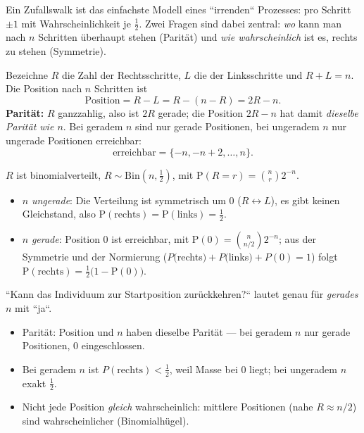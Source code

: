 


Ein Zufallswalk ist das einfachste Modell eines ``irrenden`` Prozesses:
pro Schritt $\pm1$ mit Wahrscheinlichkeit je $\tfrac12$. Zwei Fragen sind
dabei zentral: \emph{wo} kann man nach $n$ Schritten überhaupt stehen
(Parität) und \emph{wie wahrscheinlich} ist es, rechts zu stehen
(Symmetrie).

\begin{werkzeugkasten}[Zentrale Beziehung: Position = $2R-n$]
Bezeichne $R$ die Zahl der Rechtsschritte, $L$ die der Linksschritte und
$R+L=n$. Die Position nach $n$ Schritten ist
\begin{equation}
  \text{Position} = R-L = R-(n-R)=2R-n .
\end{equation}
\textbf{Parität:} $R$ ganzzahlig, also ist $2R$ gerade; die Position
$2R-n$ hat damit \emph{dieselbe Parität wie $n$}. Bei geradem $n$ sind nur
gerade Positionen, bei ungeradem $n$ nur ungerade Positionen erreichbar:
\begin{equation}
  \text{erreichbar}=\{-n,-n+2,\dots,n\}.
\end{equation}
\end{werkzeugkasten}

\begin{werkzeugkasten}
$R$ ist binomialverteilt, $R\sim\mathrm{Bin}(n,\tfrac12)$, mit
$\mathrm P(R=r)=\binom{n}{r}2^{-n}$.
\begin{itemize}
  \item $n$ \emph{ungerade}: Die Verteilung ist symmetrisch um $0$
        ($R\leftrightarrow L$), es gibt keinen Gleichstand, also
        $\mathrm P(\text{rechts})=\mathrm P(\text{links})=\tfrac12$.
  \item $n$ \emph{gerade}: Position $0$ ist erreichbar, mit
        $\mathrm P(0)=\binom{n}{n/2}2^{-n}$; aus der Symmetrie und der
        Normierung ($P($rechts$)+P($links$)+P(0)=1$) folgt
        $\mathrm P(\text{rechts})=\frac12\bigl(1-\mathrm P(0)\bigr)$.
\end{itemize}
``Kann das Individuum zur Startposition zurückkehren?`` lautet genau für
\emph{gerades} $n$ mit ``ja``.
\end{werkzeugkasten}

\begin{achtung}
\begin{itemize}
  \item Parität: Position und $n$ haben dieselbe Parität --- bei geradem
        $n$ nur gerade Positionen, $0$ eingeschlossen.
  \item Bei geradem $n$ ist $P(\text{rechts})<\tfrac12$, weil Masse bei
        $0$ liegt; bei ungeradem $n$ exakt $\tfrac12$.
  \item Nicht jede Position \emph{gleich} wahrscheinlich: mittlere
        Positionen (nahe $R\approx n/2$) sind wahrscheinlicher
        (Binomialhügel).
\end{itemize}
\end{achtung}
